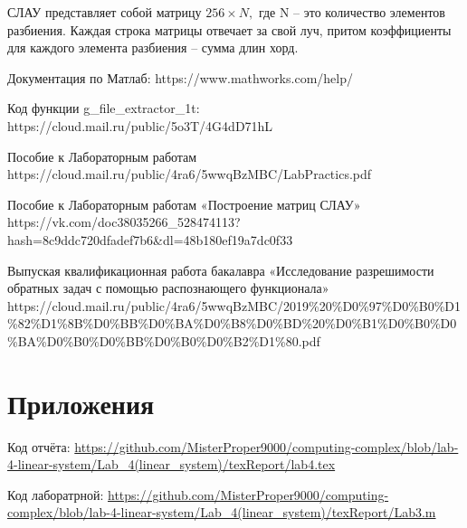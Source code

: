 \documentclass[a4]{article}
\begin{document}
СЛАУ представляет собой матрицу $256\times N,$ где N – это количество элементов разбиения.
Каждая строка матрицы отвечает за свой луч, притом коэффициенты для каждого элемента разбиения – сумма длин хорд.


\begin{thebibliography}{}
      Документация по Матлаб: https://www.mathworks.com/help/

     Код функции g\_file\_extractor\_1t: https://cloud.mail.ru/public/5o3T/4G4dD71hL
    
    Пособие к Лабораторным работам https://cloud.mail.ru/public/4ra6/5wwqBzMBC/LabPractics.pdf
    
    Пособие к Лабораторным работам «Построение матриц СЛАУ» https://vk.com/doc38035266\_528474113?hash=8c9ddc720dfadef7b6\&dl=48b180ef19a7dc0f33
    
    Выпуская квалификационная работа бакалавра «Исследование разрешимости обратных задач с помощью распознающего функционала» https://cloud.mail.ru/public/4ra6/5wwqBzMBC/2019\%20\%D0\%97\%D0\%B0\%D1\%82\%D1\%8B\%D0\%BB\%D0\%BA\%D0\%B8\%D0\%BD\%20\%D0\%B1\%D0\%B0\%D0\%BA\%D0\%B0\%D0\%BB\%D0\%B0\%D0\%B2\%D1\%80.pdf
\end{thebibliography}

\section{Приложения}

Код отчёта:\; \url{https://github.com/MisterProper9000/computing-complex/blob/lab-4-linear-system/Lab_4(linear\_system)/texReport/lab4.tex}

Код лаборатрной:\; \url{https://github.com/MisterProper9000/computing-complex/blob/lab-4-linear-system/Lab_4(linear\_system)/texReport/Lab3.m}
\end{document}
